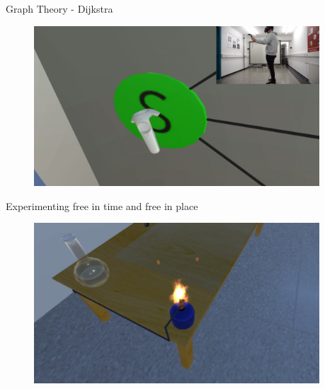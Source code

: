 \documentclass[final,hyperref={pdfpagelabels=false}]{beamer}
\begin{document}
\begin{frame}[t]
\begin{columns}[t]
\begin{column}{.465\textwidth}
\begin{block}{Graph Theory - Dijkstra}
	\begin{figure}
		\centering
		\includegraphics[width=0.95\linewidth]{VSL_Screen_2}

	\end{figure}
\end{block}

\vspace{0.3cm}

\begin{block}{Experimenting free in time and free in place}
    \begin{figure}
    	\centering
    	\includegraphics[width=0.95\linewidth]{bunsenbrenner}
    \end{figure}
\end{block}

\end{column} %

\begin{column}{.03\textwidth}\end{column} %


\end{columns}
\end{frame}
\end{document}
